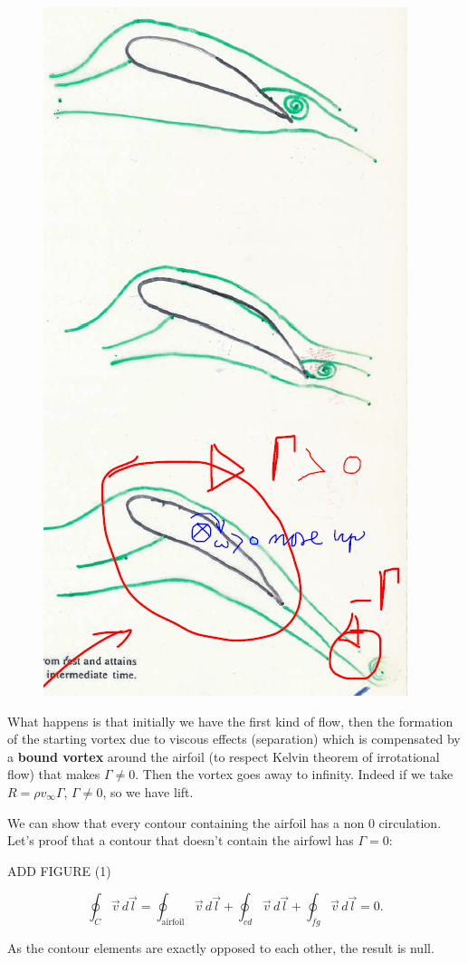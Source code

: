 		\begin{figure}
		\vspace{-5mm}
		\includegraphics[scale=0.25]{ch1/5}
		\end{figure}
		What happens is that initially we have the first kind of flow, then the formation of the starting vortex due to viscous effects (separation) which is compensated by a \textbf{bound vortex} around the airfoil (to respect Kelvin theorem of irrotational flow) that makes $\Gamma \neq 0$. Then the vortex goes away to infinity. Indeed if we take $R = \rho v_\infty \Gamma$, $\Gamma \neq 0$, so we have lift. 
		
		We can show that every contour containing the airfoil has a non 0 circulation. Let's proof that a contour that doesn't contain the airfowl has $\Gamma =0$: 
		
		ADD FIGURE (1)
		
		\begin{equation}
		\oint _{C} \vec{v}\, d\vec{l} = \oint _{\mbox{airfoil}} \vec{v}\, d\vec{l} + \oint _{cd} \vec{v}\, d\vec{l} + \oint _{fg} \vec{v}\, d\vec{l} = 0. 
		\end{equation}
		
		As the contour elements are exactly opposed to each other, the result is null. 